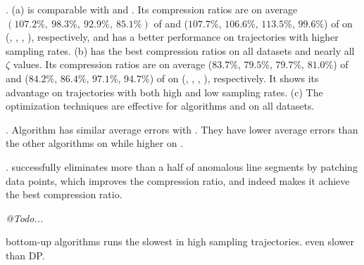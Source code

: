 \emph{}. (a) \operb is comparable {with \fbqsa and \dpa}. Its compression ratios are on average $(107.2\%, ~98.3\%, ~92.9\%, ~85.1\%)$ of \fbqsa and ($107.7\%$, $106.6\%$, $113.5\%$, $99.6\%$) of \dpa on (\taxi, \truck, \sercar, \geolife), respectively, and \operb has a better performance on trajectories with higher sampling rates.
(b) \operba has the best compression ratios on all datasets and nearly all $\zeta$ values.
Its compression ratios are on average {($83.7\%$, $79.5\%$, $79.7\%$, $81.0\%$)} of \fbqsa and {($84.2\%$, $86.4\%$, $97.1\%$, $94.7\%$)} of \dpa on (\taxi, \truck, \sercar, \geolife), respectively.
It shows its advantage on trajectories with both high and low sampling rates.
(c) The optimization techniques are effective for algorithms \operb and \operba on all datasets.

\emph{}. {Algorithm \operb has similar average errors with \operba. They have lower average errors than the other algorithms on \taxi while higher on \sercar.}

\emph{}. \operba  successfully eliminates more than a half of anomalous line segments by patching data points,
which improves the compression ratio, and indeed makes it achieve the best compression ratio.


\em
@Todo...

bottom-up algorithms runs the slowest in high sampling trajectories. even slower than DP.

\em




